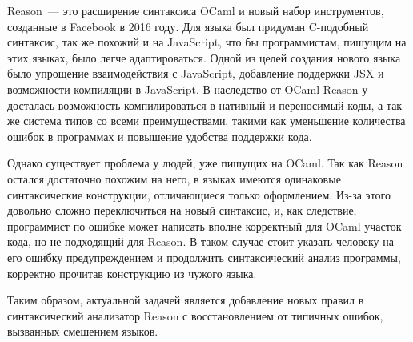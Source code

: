 Reason~--- это расширение синтаксиса OCaml и новый набор инструментов, созданные в Facebook в 2016 году. Для языка был придуман C-подобный синтаксис, так же похожий и на JavaScript, что бы программистам, пишущим на этих языках, было легче адаптироваться\cite{RE}. Одной из целей создания нового языка было упрощение взаимодействия с JavaScript, добавление поддержки JSX и возможности компиляции в JavaScript\cite{WE}. В наследство от OCaml Reason-у досталась возможность компилироваться в нативный и переносимый коды, а так же система типов со всеми преимуществами, такими как уменьшение количества ошибок в программах и повышение удобства поддержки кода.

Однако существует проблема у людей, уже пишущих на OCaml. Так как Reason остался достаточно похожим на него, в языках имеются одинаковые синтаксические конструкции, отличающиеся только оформлением. Из-за этого довольно сложно переключиться на новый синтаксис, и, как следствие, программист по ошибке может написать вполне корректный для OCaml участок кода, но не подходящий для Reason. В таком случае стоит указать человеку на его ошибку предупреждением и продолжить синтаксический анализ программы, корректно прочитав конструкцию из чужого языка.

Таким образом, актуальной задачей является добавление новых правил в синтаксический анализатор Reason с восстановлением от типичных ошибок, вызванных смешением языков.